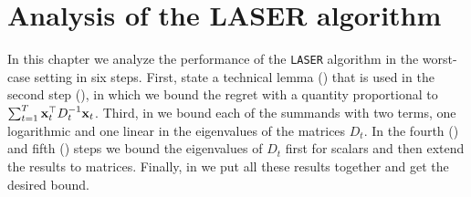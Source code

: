 \chapter{Analysis of the LASER algorithm}
\label{chap:LASER_analysis}

In this chapter we analyze the performance of the \texttt{LASER} algorithm in the worst-case
setting in six steps. First, state a technical lemma () that is used in
the second step (), in which we bound the regret with a quantity
proportional to
$\sum_{t=1}^{T}{\mathbf{x}}^{\top}_{t}D_{t}^{-1}\mathbf{x}_{t}$. Third,
in  we bound each of the summands with two terms,
one logarithmic and one linear in the eigenvalues of the matrices
$D_{t}$. In the fourth () and fifth ()
steps we bound the eigenvalues of $D_{t}$ first for scalars
and then extend the results to matrices. Finally, in  we put
all these results together and get the desired bound.


